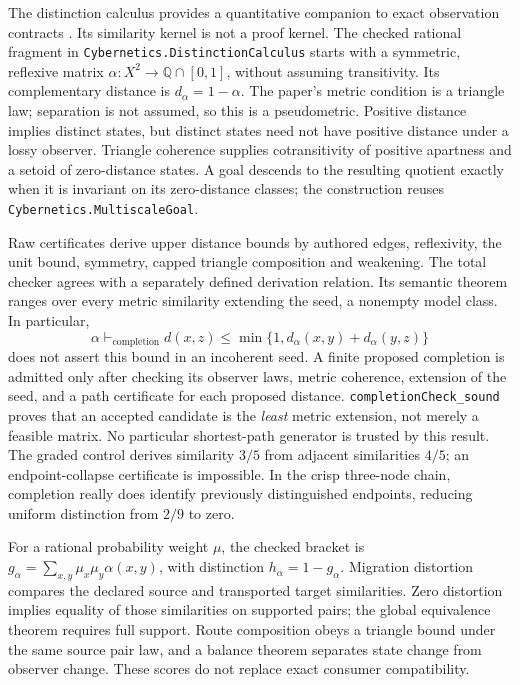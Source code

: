 \documentclass[11pt]{article}
\theoremstyle{definition}
\theoremstyle{remark}
\begin{document}
The distinction calculus provides a quantitative companion to exact
observation contracts \cite{GoertzelDistinctionCalculus,GoertzelDistinctionClosure}.
Its similarity kernel is not a proof kernel. The checked rational fragment
in \nolinkurl{Cybernetics.DistinctionCalculus} starts with a symmetric,
reflexive matrix $\alpha:X^2\to\mathbb{Q}\cap[0,1]$, without assuming
transitivity. Its complementary distance is $d_\alpha=1-\alpha$.
The paper's metric condition is a triangle law; separation is not assumed,
so this is a pseudometric. Positive distance implies distinct states, but
distinct states need not have positive distance under a lossy observer.
Triangle coherence supplies cotransitivity of positive apartness and a
setoid of zero-distance states. A goal descends to the resulting quotient
exactly when it is invariant on its zero-distance classes; the construction
reuses \nolinkurl{Cybernetics.MultiscaleGoal}.

Raw certificates derive upper distance bounds by authored edges,
reflexivity, the unit bound, symmetry, capped triangle composition and
weakening. The total checker agrees with a separately defined derivation
relation. Its semantic theorem ranges over every metric similarity extending
the seed, a nonempty model class. In particular,
\[
\alpha\vdash_{\mathrm{completion}} d(x,z)\leq
\min\{1,d_\alpha(x,y)+d_\alpha(y,z)\}
\]
does not assert this bound in an incoherent seed. A finite proposed
completion is admitted only after checking its observer laws, metric
coherence, extension of the seed, and a path certificate for each proposed
distance. \nolinkurl{completionCheck_sound} proves that an accepted
candidate is the \emph{least} metric extension, not merely a feasible
matrix. No particular shortest-path generator is trusted by this result.
The graded control derives similarity $3/5$ from adjacent similarities
$4/5$; an endpoint-collapse certificate is impossible. In the crisp
three-node chain, completion really does identify previously distinguished
endpoints, reducing uniform distinction from $2/9$ to zero.

For a rational probability weight $\mu$, the checked bracket is
$g_\alpha=\sum_{x,y}\mu_x\mu_y\alpha(x,y)$, with distinction
$h_\alpha=1-g_\alpha$. Migration distortion compares the declared source
and transported target similarities. Zero distortion implies equality of
those similarities on supported pairs; the global equivalence theorem
requires full support. Route composition obeys a triangle bound under the
same source pair law, and a balance theorem separates state change from
observer change. These scores do not replace exact consumer compatibility.
\end{document}
